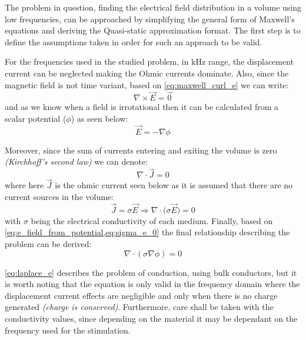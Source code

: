 \noindent The problem in question, finding the electrical field distribution in a volume using low frequencies, can be approached by simplifying the general form of Maxwell's equations and deriving the Quasi-static approximation format. The first step is to define the assumptions taken in order for such an approach to be valid.

For the frequencies used in the studied problem, in \si{kHz} range, the displacement current can be neglected making the Ohmic currents dominate. Also, since the magnetic field is not time variant, based on \autoref{eq:maxwell_curl_e} we can write:
\begin{equation}
    \label{eq:curl_zero_e_field}
    \nabla\times\vec{E} = \vec{0}
\end{equation}
and as we know when a field is irrotational then it can be calculated from a scalar potential ($\phi$) as seen below:
\begin{equation}
    \label{eq:e_field_from_potential}
    \boxed{\vec{E} = -\nabla\phi}
\end{equation}

\noindent Moreover, since the sum of currents entering and exiting the volume is zero \textit{(Kirchhoff's second law)} we can denote:
\begin{equation}
    \nabla\cdot\vec{J} = 0
\end{equation}
where here $\vec{J}$ is the ohmic current seen below as it is assumed that there are no current sources in the volume:
\begin{equation}
    \label{eq:sigma_e_0}
    \vec{J} = \sigma\vec{E}\Rightarrow\boxed{\nabla\cdot\big(\sigma\vec{E}\big) = 0}
\end{equation}
with $\sigma$ being the electrical conductivity of each medium. Finally, based on \cref{eq:e_field_from_potential,eq:sigma_e_0} the final relationship describing the problem can be derived:
\begin{equation}
    \label{eq:laplace_e}
    \boxed{\nabla\cdot(\sigma\nabla\phi) = 0}
\end{equation}

\autoref{eq:laplace_e} describes the problem of conduction, using bulk conductors, but it is worth noting that the equation is only valid in the frequency domain where the displacement current effects are negligible and only when there is no charge generated \textit{(charge is conserved)}. Furthermore, care shall be taken with the conductivity values, since depending on the material it may be dependant on the frequency used for the stimulation.

